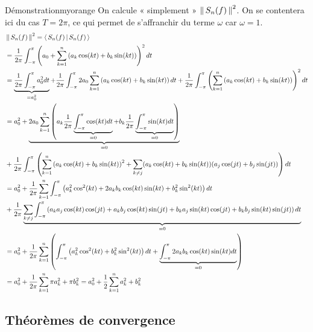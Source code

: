     \begin{omed}{Démonstration}{myorange}
        On calcule « simplement » $\left\lVert \,S_n(f) \, \right\rVert^2$. On se contentera ici du cas $T = 2\pi$, ce qui permet de s’affranchir du terme $\omega$ car $\omega=1$.
        \begin{align*}
            &\left\lVert \,S_n(f) \, \right\rVert^2 = \left<\,S_n(f)\,\middle|\,S_n(f)\,\right>  \\
            &= \frac{1}{2 \pi} \int_{-\pi}^{\pi} \left(a_0 + \sum\limits_{k=1}^n \left(a_k\cos(k t)+b_k\sin(k t)\right) \right)^2 dt \\
            &= \underbrace{\frac{1}{2 \pi} \int_{-\pi}^{\pi} a_0^2 dt}_{= a_0^2} + \frac{1}{2 \pi} \int_{-\pi}^{\pi} 2 a_0 \sum\limits_{k=1}^n \left(a_k \cos(kt) + b_k \sin(kt)\right)dt + \frac{1}{2 \pi} \int_{-\pi}^{\pi} \left( \sum\limits_{k=1}^n \left(a_k \cos(kt) + b_k \sin(kt)\right) \right)^2dt \\
            &= a_0^2 + \underbrace{2a_0 \sum\limits_{k=1}^n \left(a_k \frac{1}{2\pi}\underbrace{\int_{-\pi}^{\pi} \cos(kt)dt}_{= 0} + b_k \frac{1}{2 \pi} \underbrace{\int_{-\pi}^{\pi} \sin(kt)dt}_{= 0} \right)}_{= 0} \\
            &+ \frac{1}{2 \pi} \int_{-\pi}^{\pi} \left( \sum\limits_{k=1}^n \left(a_k \cos(kt) + b_k \sin(kt)\right)^2 + \sum\limits_{k \neq j} (a_k \cos(kt) + b_k \sin(kt))(a_j \cos(jt) + b_j \sin(jt))\right)dt \\
            &= a_0^2 + \frac{1}{2 \pi} \sum\limits_{k=1}^n \int_{-\pi}^{\pi} \left(a_k^2 \cos^2(kt) + 2a_kb_k \cos(kt) \sin(kt) + b_k^2 \sin^2(kt)\right)dt \\
            &+ \frac{1}{2\pi} \underbrace{\sum\limits_{k \neq j} \int_{-\pi}^{\pi} \left(a_k a_j \cos(kt) \cos(jt) + a_k b_j \cos(kt) \sin(jt) + b_k a_j \sin(kt) \cos(jt) + b_k b_j \sin(kt) \sin(jt)\right) dt}_{= 0} \\
            & = a_0^2 + \frac{1}{2 \pi} \sum\limits_{k=1}^n \left( \int_{-\pi}^{\pi} \left(a_k^2 \cos^2(kt) + b_k^2\sin^2(kt)\right)dt + \underbrace{\int_{-\pi}^{\pi} 2 a_k b_k \cos(kt) \sin(kt) dt}_{= 0} \right) \\
            &= a_0^2 + \frac{1}{2 \pi} \sum\limits_{k=1}^n \pi a_k^2 + \pi b_k^2  = a_0^2 + \frac{1}{2} \sum\limits_{k=1}^n a_k^2 + b_k^2  
        \end{align*}
        \null\hfill{\textcolor{myorange}{}}
    \end{omed}

\subsection{Théorèmes de convergence}

